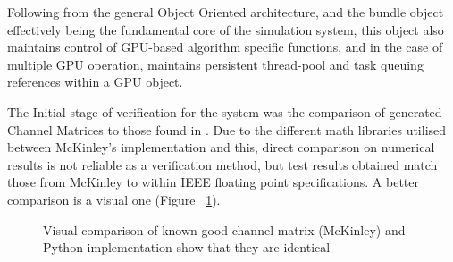 Following from the general Object Oriented architecture, and the bundle object effectively being the fundamental core of the simulation system, this object also maintains control of GPU-based algorithm specific functions, and in the case of multiple GPU operation, maintains persistent thread-pool and task queuing references within a GPU object.

The Initial stage of verification for the system was the comparison of generated Channel Matrices to those found in \cite{AM09}. Due to the different math libraries utilised between McKinley's implementation and this, direct comparison on numerical results is not reliable as a verification method, but test results obtained match those from McKinley to within IEEE floating point specifications. A better comparison is a visual one (Figure ~\ref{fig:cmComparison}).

\begin{figure}[h!]
  \centering
  \caption{Visual comparison of known-good channel matrix (McKinley) and Python implementation show that they are identical}
  \label{fig:cmComparison}
\end{figure}


